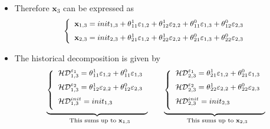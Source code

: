 \documentclass[10pt,handout]{beamer}
\begin{document}
\vspace{0.1cm}

\begin{frame}
\begin{itemize}
\item Therefore $\mathbf{x}_{3}$ can be expressed as 
\begin{equation*}
{\small \left\{ 
\begin{array}{l}
\mathbf{x}_{1,3}=init_{1,3}+\theta _{11}^{1}\varepsilon _{1,2}+\theta
_{12}^{1}\varepsilon _{2,2}+\theta _{11}^{0}\varepsilon _{1,3}+\theta
_{12}^{0}\varepsilon _{2,3}\medskip \\ 
\mathbf{x}_{2,3}=init_{2,3}+\theta _{21}^{1}\varepsilon _{1,2}+\theta
_{22}^{1}\varepsilon _{2,2}+\theta _{21}^{0}\varepsilon _{1,3}+\theta
_{22}^{0}\varepsilon _{2,3}%
\end{array}%
\right. }
\end{equation*}%
\pause

\item The historical decomposition is given by 
\begin{equation*}
\begin{array}{ccc}
\underset{\text{This sums up to }\mathbf{x}_{1,3}}{\underbrace{{\small %
\left\{ 
\begin{array}{l}
\mathcal{HD}_{1,3}^{\varepsilon _{1}}=\theta _{11}^{1}\varepsilon
_{1,2}+\theta _{11}^{0}\varepsilon _{1,3}\medskip \\ 
\mathcal{HD}_{1,3}^{\varepsilon _{2}}=\theta _{12}^{1}\varepsilon
_{2,2}+\theta _{12}^{0}\varepsilon _{2,3}\medskip \\ 
\mathcal{HD}_{1,3}^{init}=init_{1,3}\medskip%
\end{array}%
\right. }}} &  & \underset{\text{This sums up to }\mathbf{x}_{2,3}}{%
\underbrace{{\small \left\{ 
\begin{array}{l}
\mathcal{HD}_{2,3}^{\varepsilon _{1}}=\theta _{21}^{1}\varepsilon
_{1,2}+\theta _{21}^{0}\varepsilon _{1,3}\medskip \\ 
\mathcal{HD}_{2,3}^{\varepsilon _{2}}=\theta _{22}^{1}\varepsilon
_{2,2}+\theta _{22}^{0}\varepsilon _{2,3}\medskip \\ 
\mathcal{HD}_{2,3}^{init}=init_{2,3}\medskip%
\end{array}%
\right. }}}%
\end{array}%
\end{equation*}
\end{itemize}
\end{frame}

\vspace{0.1cm}
\end{document}

